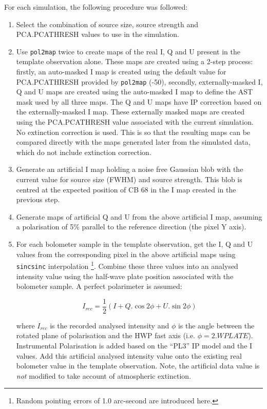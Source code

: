 \documentclass[twoside,11pt]{starlink}
\begin{document}
For each simulation, the following procedure was followed:

\begin{enumerate}
\item Select the combination of source size, source strength and
PCA.PCATHRESH values to use in the simulation.
\item Use \texttt{pol2map} twice to create maps of the real I, Q and U present
in the template observation alone. These maps are created using a 2-step
process: firstly, an auto-masked I map is created using the default value
for PCA.PCATHRESH provided by \texttt{pol2map} (-50), secondly,
externally-masked I, Q and U maps are created using the auto-masked I map
to define the AST mask used by all three maps. The Q and U maps have IP
correction based on the externally-masked I map. These externally masked
maps are created using the PCA.PCATHRESH value associated with the
current simulation. No extinction
correction is used. This is so that the resulting maps can be compared
directly with the maps generated later from the simulated data, which do
not include extinction correction.
\item Generate an artificial I map holding a noise free Gaussian blob with
the current value for source size (FWHM) and source strength. This blob
is centred at the expected  position of CB 68 in the I map created in the
previous step.
\item Generate maps of artificial Q and U from the above artificial I map,
assuming a polarisation of 5\% parallel to the reference direction (the pixel
Y axis).
\item For each bolometer sample in the template observation, get
the I, Q and U values from the corresponding pixel in the above
artificial maps using \texttt{sincsinc} interpolation \footnote{Random
pointing errors of 1.0 arc-second are introduced here.}. Combine these
three values into an analysed intensity value using the half-wave
plate position associated with the bolometer sample. A perfect polarimeter
is assumed:

\[ I_{rec} = \frac{1}{2}( I + Q.\cos 2\phi + U.\sin 2\phi ) \]

where $I_{rec}$ is the recorded analysed intensity and $\phi$ is the
angle between the rotated plane of polarisation and the HWP fast axis
(i.e. $\phi = 2.WPLATE$). Instrumental
Polarisation is added based on the ``PL3'' IP model and the I values. Add
this artificial analysed intensity value onto the existing real bolometer
value in the template observation. Note, the artificial data value is
\emph{not} modified to take account of atmospheric extinction.


\end{enumerate}
\end{document}
